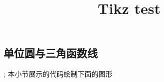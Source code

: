 \documentclass[UTF8]{ctexart}
\title{Tikz test}
\author{}
\begin{document}
\ttfamily

\setlength\parskip{0.3cm}

\maketitle

\tableofcontents

\subsection{单位圆与三角函数线}
;
本小节展示的代码绘制下面的图形
\end{document}
